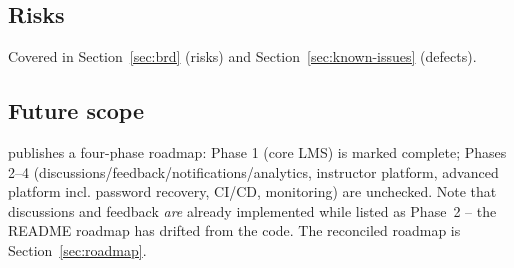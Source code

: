 \subsection{Risks}
Covered in Section~\ref{sec:brd} (risks) and Section~\ref{sec:known-issues} (defects).

\subsection{Future scope}

 publishes a four-phase roadmap: Phase 1 (core LMS) is marked complete; Phases 2--4 (discussions/feedback/notifications/analytics, instructor platform, advanced platform incl. password recovery, CI/CD, monitoring) are unchecked. Note that discussions and feedback \emph{are} already implemented while listed as Phase~2 -- the README roadmap has drifted from the code. The reconciled roadmap is Section~\ref{sec:roadmap}.
